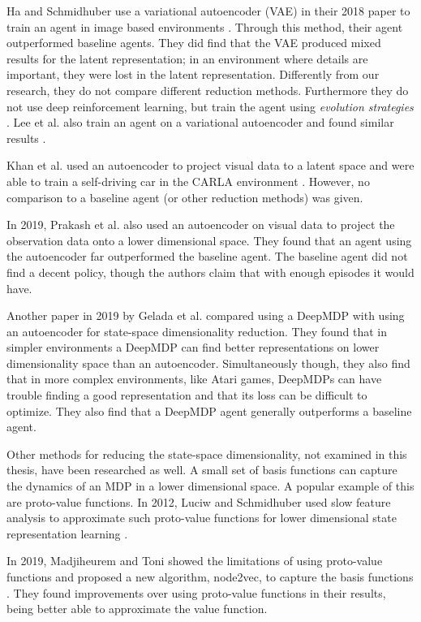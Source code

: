 Ha and Schmidhuber use a variational autoencoder (VAE) \cite{vae} in their 2018 paper to train an agent in image based environments \cite{rl_vae}. Through this method, their agent outperformed baseline agents. They did find that the VAE produced mixed results for the latent representation; in an environment where details are important, they were lost in the latent representation. Differently from our research, they do not compare different reduction methods. Furthermore they do not use deep reinforcement learning, but train the agent using \textit{evolution strategies} \cite{es}. Lee et al. also train an agent on a variational autoencoder and found similar results \cite{rl_vaetwo}.

Khan et al. used an autoencoder to project visual data to a latent space and were able to train a self-driving car in the CARLA environment \cite{rl_carla}\cite{carla}. However, no comparison to a baseline agent (or other reduction methods) was given.

In 2019, Prakash et al. \cite{AE_2019} also used an autoencoder on visual data to project the observation data onto a lower dimensional space. They found that an agent using the autoencoder far outperformed the baseline agent. The baseline agent did not find a decent policy, though the authors claim that with enough episodes it would have.

Another paper in 2019 by Gelada et al. \cite{deepmdp} compared using a DeepMDP with using an autoencoder for state-space dimensionality reduction. They found that in simpler environments a DeepMDP can find better representations on lower dimensionality space than an autoencoder. Simultaneously though, they also find that in more complex environments, like Atari games, DeepMDPs can have trouble finding a good representation and that its loss can be difficult to optimize. They also find that a DeepMDP agent generally outperforms a baseline agent. 

Other methods for reducing the state-space dimensionality, not examined in this thesis, have been researched as well. A small set of basis functions can capture the dynamics of an MDP in a lower dimensional space. A popular example of this are proto-value functions. In 2012, Luciw and Schmidhuber used slow feature analysis to approximate such proto-value functions for lower dimensional state representation learning \cite{proto}. 

In 2019, Madjiheurem and Toni showed the limitations of using proto-value functions and proposed a new algorithm, node2vec, to capture the basis functions \cite{noproto}. They found improvements over using proto-value functions in their results, being better able to approximate the value function.

